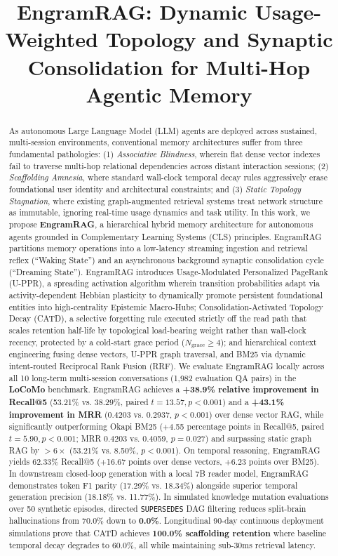 \documentclass[conference]{IEEEtran}
\title{\textbf{EngramRAG: Dynamic Usage-Weighted Topology and Synaptic Consolidation for Multi-Hop Agentic Memory}}
\author{
  \IEEEauthorblockN{Bhavyateja Potineni\IEEEauthorrefmark{1}\thanks{\IEEEauthorrefmark{1}Corresponding author: \texttt{bhavyateja.potineni@gmail.com}}, Lohit Giri, Vadim Kutsyy, and Rajasekhar Pentakota}
  \IEEEauthorblockA{\textit{Independent Researchers}\\
  \texttt{bhavyateja.potineni@gmail.com}, \texttt{lohit.giri@gmail.com}, \texttt{vadim@kutsyy.com}, \texttt{rajsekhar.cs@gmail.com}}
}
\begin{document}
\maketitle

\begin{abstract}
As autonomous Large Language Model (LLM) agents are deployed across sustained, multi-session environments, conventional memory architectures suffer from three fundamental pathologies: (1) \textit{Associative Blindness}, wherein flat dense vector indexes fail to traverse multi-hop relational dependencies across distant interaction sessions; (2) \textit{Scaffolding Amnesia}, where standard wall-clock temporal decay rules aggressively erase foundational user identity and architectural constraints; and (3) \textit{Static Topology Stagnation}, where existing graph-augmented retrieval systems treat network structure as immutable, ignoring real-time usage dynamics and task utility. In this work, we propose \textbf{EngramRAG}, a hierarchical hybrid memory architecture for autonomous agents grounded in Complementary Learning Systems (CLS) principles. EngramRAG partitions memory operations into a low-latency streaming ingestion and retrieval reflex (``Waking State'') and an asynchronous background synaptic consolidation cycle (``Dreaming State''). EngramRAG introduces Usage-Modulated Personalized PageRank (U-PPR), a spreading activation algorithm wherein transition probabilities adapt via activity-dependent Hebbian plasticity to dynamically promote persistent foundational entities into high-centrality Epistemic Macro-Hubs; Consolidation-Activated Topology Decay (CATD), a selective forgetting rule executed strictly off the read path that scales retention half-life by topological load-bearing weight rather than wall-clock recency, protected by a cold-start grace period ($N_{\text{grace}} \ge 4$); and hierarchical context engineering fusing dense vectors, U-PPR graph traversal, and BM25 via dynamic intent-routed Reciprocal Rank Fusion (RRF). We evaluate EngramRAG locally across all 10 long-term multi-session conversations (1,982 evaluation QA pairs) in the \textbf{LoCoMo} benchmark. EngramRAG achieves a \textbf{+38.9\% relative improvement in Recall@5} (53.21\% vs. 38.29\%, paired $t=13.57, p < 0.001$) and a \textbf{+43.1\% improvement in MRR} (0.4203 vs. 0.2937, $p < 0.001$) over dense vector RAG, while significantly outperforming Okapi BM25 (+4.55 percentage points in Recall@5, paired $t=5.90, p < 0.001$; MRR 0.4203 vs. 0.4059, $p = 0.027$) and surpassing static graph RAG by $>6\times$ (53.21\% vs. 8.50\%, $p < 0.001$). On temporal reasoning, EngramRAG yields 62.33\% Recall@5 (+16.67 points over dense vectors, +6.23 points over BM25). In downstream closed-loop generation with a local 7B reader model, EngramRAG demonstrates token F1 parity (17.29\% vs. 18.34\%) alongside superior temporal generation precision (18.18\% vs. 11.77\%). In simulated knowledge mutation evaluations over 50 synthetic episodes, directed \texttt{SUPERSEDES} DAG filtering reduces split-brain hallucinations from 70.0\% down to \textbf{0.0\%}. Longitudinal 90-day continuous deployment simulations prove that CATD achieves \textbf{100.0\% scaffolding retention} where baseline temporal decay degrades to 60.0\%, all while maintaining sub-30ms retrieval latency.

\end{abstract}
\end{document}
